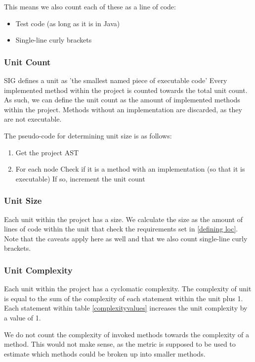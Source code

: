 \documentclass{article}
\begin{document}
This means we also count each of these as a line of code:
\begin{itemize}
\item Test code (as long as it is in Java)
\item Single-line curly brackets
\end{itemize}

\subsubsection{Unit Count}
SIG defines a unit as 'the smallest named piece of executable code'
Every implemented method within the project is counted towards the total unit count. As such, we can define the unit count as the amount of implemented methods within the project. Methods without an implementation are discarded, as they are not executable.

The pseudo-code for determining unit size is as follows:
\begin{enumerate}
\item Get the project AST
\item For each node
\subitem Check if it is a method with an implementation (so that it is executable)
\subitem If so, increment the unit count
\end{enumerate}

\subsubsection{Unit Size}
Each unit within the project has a size. We calculate the size as the amount of lines of code within the unit that check the requirements set in \ref{defining loc}. Note that the caveats apply here as well and that we also count single-line curly brackets.

\subsubsection{Unit Complexity}
Each unit within the project has a cyclomatic complexity. The complexity of unit is equal to the  sum of the complexity of each statement within the unit plus 1. Each statement within table \ref{complexityvalues} increases the unit complexity by a value of 1.

We do not count the complexity of invoked methods towards the complexity of a method. This would not make sense, as the metric is supposed to be used to estimate which methods could be broken up into smaller methods.
\end{document}
